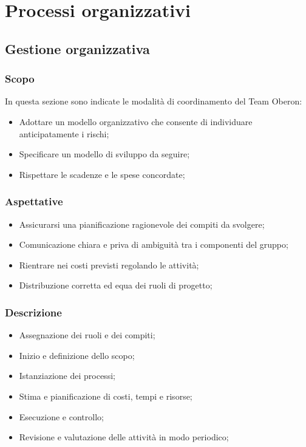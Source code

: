\section{Processi organizzativi}

\subsection{Gestione organizzativa}
\subsubsection{Scopo}
In questa sezione sono indicate le modalità di coordinamento del Team Oberon:
\begin{itemize}
    \item Adottare un modello organizzativo che consente di individuare anticipatamente i rischi;
    \item Specificare un modello di sviluppo da seguire;
    \item Rispettare le scadenze e le spese concordate; 
\end{itemize}
\subsubsection{Aspettative}
\begin{itemize}
    \item Assicurarsi una pianificazione ragionevole dei compiti da svolgere;
    \item Comunicazione chiara e priva di ambiguità tra i componenti del gruppo;
    \item Rientrare nei costi previsti regolando le attività;
    \item Distribuzione corretta ed equa dei ruoli di progetto;
\end{itemize}
\subsubsection{Descrizione}
\begin{itemize}
    \item Assegnazione dei ruoli e dei compiti;
    \item Inizio e definizione dello scopo;
    \item Istanziazione dei processi;
    \item Stima e pianificazione di costi, tempi e risorse;
    \item Esecuzione e controllo;
    \item Revisione e valutazione delle attività in modo periodico;
\end{itemize}
